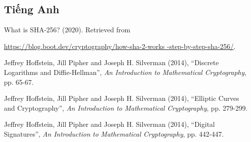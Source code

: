 
\begin{thebibliography}{1}
    \subsection*{Tiếng Anh}
    \setlength{\bibindent}{1cm}
    \setlength{\itemindent}{-\bibindent}
  
      What is SHA-256? (2020).
      Retrieved from

    \url{https://blog.boot.dev/cryptography/how-sha-2-works
    -step-by-step-sha-256/}.
  
        
    \raggedright
    Jeffrey Hoffstein, Jill Pipher and Joseph H. Silverman (2014),
    ``Discrete Logarithms and Diffie-Hellman'',
    \emph{An Introduction to Mathematical Cryptography},
    pp. 65-67.

    \raggedright
    Jeffrey Hoffstein, Jill Pipher and Joseph H. Silverman (2014),
    ``Elliptic Curves and Cryptography'',
    \emph{An Introduction to Mathematical Cryptography},
    pp. 279-299.
    \raggedright
    Jeffrey Hoffstein, Jill Pipher and Joseph H. Silverman (2014),
    ``Digital Signatures'',
    \emph{An Introduction to Mathematical Cryptography},
    pp. 442-447.
  \end{thebibliography}
